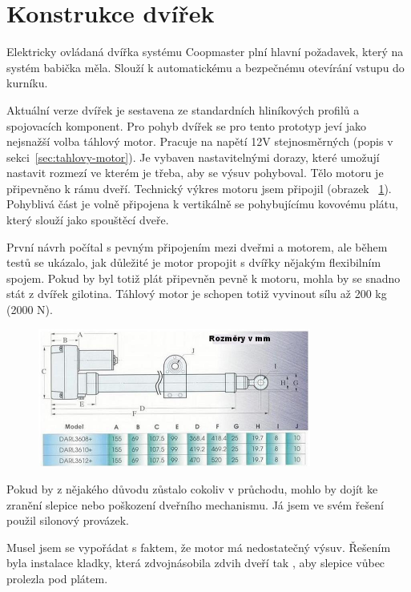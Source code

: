 \section{Konstrukce dvířek}\label{sec:konstrukce-dvirek}
Elektricky ovládaná dvířka systému Coopmaster plní hlavní požadavek, který na systém babička měla.
Slouží k automatickému a bezpečnému otevírání vstupu do kurníku.

Aktuální verze dvířek je sestavena ze standardních hliníkových profilů a spojovacích komponent.
Pro pohyb dvířek se pro tento prototyp jeví jako nejsnažší volba táhlový motor.
Pracuje na napětí 12V stejnosměrných (popis v sekci~\ref{sec:tahlovy-motor}).
Je vybaven nastavitelnými dorazy, které umožují nastavit rozmezí ve kterém je třeba, aby se výsuv pohyboval.
Tělo motoru je připevněno k rámu dveří.
Technický výkres motoru jsem připojil (obrazek ~\ref{fig:instalace_dvere_tahlovy_motor}).
Pohyblivá část je volně připojena k vertikálně se pohybujícímu kovovému plátu, který slouží jako spouštěcí dveře.

První návrh počítal s pevným připojením mezi dveřmi a motorem, ale během testů se ukázalo, jak důležité je motor propojit s dvířky nějakým flexibilním spojem.
Pokud by byl totiž plát připevněn pevně k motoru, mohla by se snadno stát z dvířek gilotina.
Táhlový motor je schopen totiž vyvinout sílu až 200 kg (2000 N).

\begin{figure}[h]
    \centering
    \includegraphics[width=0.8\textwidth]{img/instalace_dvere_tahlovy_motor}
    \label{fig:instalace_dvere_tahlovy_motor}
\end{figure}

Pokud by z nějakého důvodu zůstalo cokoliv v průchodu, mohlo by dojít ke zranění slepice nebo poškození dveřního mechanismu.
Já jsem ve svém řešení použil silonový provázek.

Musel jsem se vypořádat s faktem, že motor má nedostatečný výsuv.
Řešením byla instalace kladky, která zdvojnásobila zdvih dveří tak , aby slepice vůbec prolezla pod plátem.

